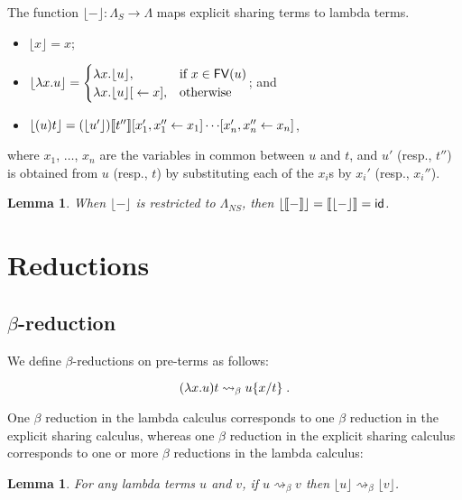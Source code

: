 \documentclass[11pt,a4paper]{article}
\theoremstyle{definition}
\theoremstyle{plain}
\newtheorem{lemma}[definition]{Lemma}
\theoremstyle{remark}
\begin{document}
\newcommand{\tercoden}[1]{{\lfloor{#1}\rfloor}}

The function $\tercoden{-}:\Lambda_S\rightarrow\Lambda$ maps explicit sharing terms to lambda terms.

\begin{itemize}
	\item $\tercoden{x}=x$;
	\item $\tercoden{\lambda x.u}=
	  \begin{cases}
	      \lambda x.\tercoden{u}, & \mbox{if }x\in\FV(u) \\
	      \lambda x.\ternullshare{\tercoden{u}}{x}, & \mbox{otherwise}
	  \end{cases}$; and
	\item $\tercoden{(u)t}=\terbishare{\terbishare{(\tercoden{u'})\terden{t''}}{x'_1}{x''_1}{x_1}\cdots}{x'_n}{x''_n}{x_n}$,
\end{itemize}
where $x_1$, $\dots$, $x_n$ are the variables in common between $u$ and $t$, and $u'$ (resp., $t''$) is obtained from $u$ (resp., $t$) by substituting each of the $x_i$s by $x_i'$ (resp., $x_i''$).

\begin{lemma}
 When $\tercoden{-}$ is restricted to $\Lambda_{NS}$, then $\tercoden{\terden{-}}=\terden{\tercoden{-}}=\mathsf{id}$.
\end{lemma}

\section{Reductions}

\subsection{$\beta$-reduction}

We define $\beta$-reductions on pre-terms as follows:

\[(\lambda x.u)t \rightsquigarrow_\beta { {u}\{{x}/{t}\} }\;.\]

One $\beta$ reduction in the lambda calculus corresponds to one $\beta$ reduction in the explicit sharing calculus, whereas one $\beta$ reduction in the explicit sharing calculus corresponds to one or more $\beta$ reductions in the lambda calculus:

\begin{lemma}
For any lambda terms $u$ and $v$, if $u\rightsquigarrow_\beta v$ then $\tercoden{u}\rightsquigarrow_\beta\tercoden{v}$.
\end{lemma}
\end{document}
